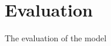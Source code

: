 \chapter{Evaluation}
The evaluation of the model

\begin{landscape}
\hspace*{\fill}
\noindent
\hspace*{\fill}
\\
\hspace*{\fill}

\hspace*{\fill}
\\
\hspace*{\fill}

\hspace*{\fill}
\\
\hspace*{\fill}

\hspace*{\fill}
\\
\hspace*{\fill}

\hspace*{\fill}
\\
\hspace*{\fill}

\hspace*{\fill}
\\
\hspace*{\fill}

\hspace*{\fill}
\end{landscape}

